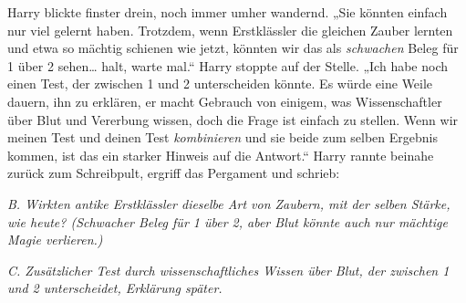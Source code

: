 Harry blickte finster drein, noch immer umher wandernd. „Sie könnten einfach nur viel gelernt haben. Trotzdem, wenn Erstklässler die gleichen Zauber lernten und etwa so mächtig schienen wie jetzt, könnten wir das als \emph{schwachen} Beleg für 1 über 2 sehen… halt, warte mal.“ Harry stoppte auf der Stelle. „Ich habe noch einen Test, der zwischen 1 und 2 unterscheiden könnte. Es würde eine Weile dauern, ihn zu erklären, er macht Gebrauch von einigem, was Wissenschaftler über Blut und Vererbung wissen, doch die Frage ist einfach zu stellen. Wenn wir meinen Test und deinen Test \emph{kombinieren} und sie beide zum selben Ergebnis kommen, ist das ein starker Hinweis auf die Antwort.“ Harry rannte beinahe zurück zum Schreibpult, ergriff das Pergament und schrieb:

\emph{B. Wirkten antike Erstklässler dieselbe Art von Zaubern, mit der selben Stärke, wie heute? (Schwacher Beleg für 1 über 2, aber Blut könnte auch nur mächtige Magie verlieren.)}

\emph{C. Zusätzlicher Test durch wissenschaftliches Wissen über Blut, der zwischen 1 und 2 unterscheidet, Erklärung später.}

